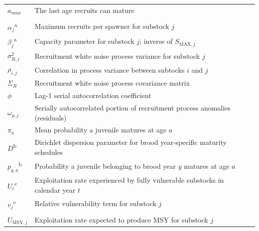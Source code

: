 \documentclass[12pt,]{book}
\theoremstyle{definition}
\theoremstyle{definition}
\theoremstyle{definition}
\theoremstyle{remark}
\begin{document}
\begin{ThreePartTable}
\begin{longtable}[t]{l>{\raggedright\arraybackslash}p{400px}ll}
\hspace{1em}$a_{max}$ & The last age recruits can mature\\
\addlinespace[0.3em]
\hline
\multicolumn{4}{l}{\textbf{Parameters}}\\
\hline
\hspace{1em}$\alpha_j$\textsuperscript{a} & Maximum recruits per spawner for substock $j$\\
\hspace{1em}$\beta_j$\textsuperscript{a} & Capacity parameter for substock $j$; inverse of $S_{\text{MAX},j}$\\
\hspace{1em}$\sigma^2_{R,j}$ & Recruitment white noise process variance for substock $j$\\
\hspace{1em}$\rho_{i,j}$ & Correlation in process variance between subtocks $i$ and $j$\\
\hspace{1em}$\Sigma_R$ & Recruitment white noise process covariance matrix\\
\hspace{1em}$\phi$ & Lag-1 serial autocorrelation coefficient\\
\hspace{1em}$\omega_{y,j}$ & Serially autocorrelated portion of recruitment process anomalies (residuals)\\
\hspace{1em}$\pi_a$ & Mean probability a juvenile matures at age $a$\\
\hspace{1em}$D$\textsuperscript{b} & Dirichlet dispersion parameter for brood year-specific maturity schedules\\
\hspace{1em}$p_{y,a}$\textsuperscript{b} & Probability a juvenile belonging to brood year $y$ matures at age $a$\\
\hspace{1em}$U_t$\textsuperscript{c} & Exploitation rate experienced by fully vulnerable substocks in calendar year $t$\\
\hspace{1em}$v_j$\textsuperscript{c} & Relative vulnerability term for substock $j$\\
\addlinespace[0.3em]
\hline
\multicolumn{4}{l}{\textbf{Biological Reference Points}}\\
\hline
\hspace{1em}$U_{\text{MSY},j}$ & Exploitation rate expected to produce MSY for substock $j$\\

\end{longtable}
\end{ThreePartTable}
\end{document}
